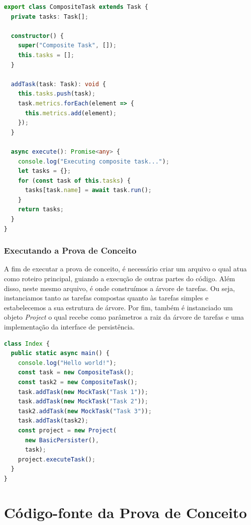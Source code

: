 \documentclass[12pt]{tcc}
\begin{document}
\begin{lstlisting}[label={lst:composite_task}, caption={Tarefa composta, define o comportamento de todos os nós não folha da árvore de tarefas.}, language=TypeScript]
export class CompositeTask extends Task {
  private tasks: Task[];

  constructor() {
    super("Composite Task", []);
    this.tasks = [];
  }

  addTask(task: Task): void {
    this.tasks.push(task);
    task.metrics.forEach(element => {
      this.metrics.add(element);
    });
  }

  async execute(): Promise<any> {
    console.log("Executing composite task...");
    let tasks = {};
    for (const task of this.tasks) {
      tasks[task.name] = await task.run();
    }
    return tasks;
  }
}
\end{lstlisting}


\subsection{Executando a Prova de Conceito}
\label{sec:exe_poc}
A fim de executar a prova de conceito, é necessário criar um arquivo o qual atua como roteiro principal, guiando a execução de outras partes do código.
Além disso, neste mesmo arquivo, é onde construímos a árvore de tarefas.
Ou seja, instanciamos tanto as tarefas compostas quanto às tarefas simples e estabelecemos a sua estrutura de árvore.
Por fim, também é instanciado um objeto \emph{Project} o qual recebe como parâmetros a raiz da árvore de tarefas e uma implementação da interface de persistência.

\begin{lstlisting}[label={lst:index_ts}, caption={Exemplo de roteiro principal para executar a prova de conceito.}, language=TypeScript]
class Index {
  public static async main() {
    console.log("Hello world!");
    const task = new CompositeTask();
    const task2 = new CompositeTask();
    task.addTask(new MockTask("Task 1"));
    task.addTask(new MockTask("Task 2"));
    task2.addTask(new MockTask("Task 3"));
    task.addTask(task2);
    const project = new Project(
      new BasicPersister(),
      task);
    project.executeTask();
  }
}
\end{lstlisting}


\chapter{Código-fonte da Prova de Conceito}
\label{apx:mock_source}
\end{document}
